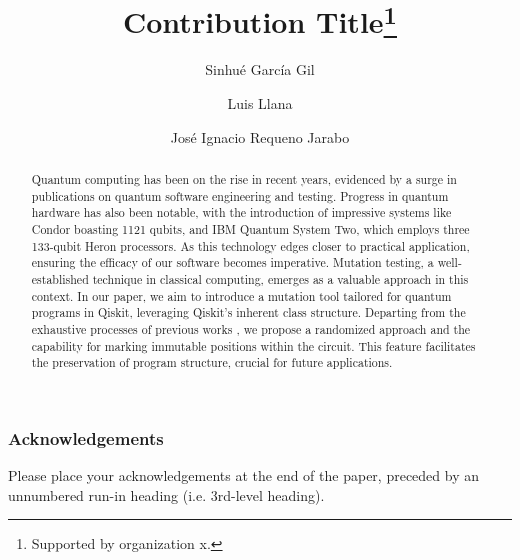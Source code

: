 \documentclass[runningheads]{llncs}
\begin{document}
%
\title{Contribution Title\thanks{Supported by organization x.}}
%
%
\author{Sinhué García Gil \and
Luis Llana\and
José Ignacio Requeno Jarabo}
%
%
%
\maketitle           %
%
\begin{abstract}
Quantum computing has been on the rise in recent years, evidenced by a surge in publications on quantum software engineering and testing. Progress in quantum hardware has also been notable, with the introduction of impressive systems like Condor boasting 1121 qubits, and IBM Quantum System Two, which employs three 133-qubit Heron processors. As this technology edges closer to practical application, ensuring the efficacy of our software becomes imperative. Mutation testing, a well-established technique in classical computing, emerges as a valuable approach in this context. In our paper, we aim to introduce a mutation tool tailored for quantum programs in Qiskit, leveraging Qiskit's inherent class structure. Departing from the exhaustive processes of previous works \cite{mendiluze2021muskit} \cite{fortunato2022qmutpy}, we propose a randomized approach and the capability for marking immutable positions within the circuit. This feature facilitates the preservation of program structure, crucial for future applications.

\end{abstract}
%
%
%






\subsubsection{Acknowledgements} Please place your acknowledgements at
the end of the paper, preceded by an unnumbered run-in heading (i.e.
3rd-level heading).

%
%
%


\end{document}
